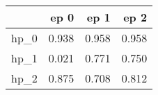 \begin{tabular}{lrrr}
\toprule
{} &   ep 0 &   ep 1 &   ep 2 \\
\midrule
hp\_0 &  0.938 &  0.958 &  0.958 \\
hp\_1 &  0.021 &  0.771 &  0.750 \\
hp\_2 &  0.875 &  0.708 &  0.812 \\
\bottomrule
\end{tabular}
